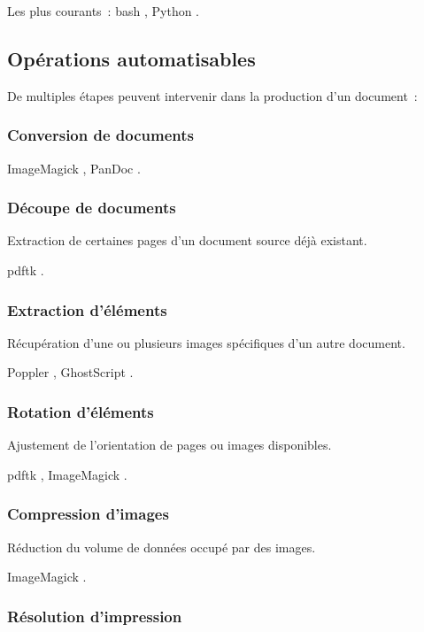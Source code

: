 Les plus courants : \gls{bash} \cite{bash}, Python \cite{py}.

\pagebreak
\subsection{Opérations automatisables}

De multiples étapes peuvent intervenir dans la production d’un document :

\subsubsection{Conversion de documents}

ImageMagick \cite{imagemagick}, PanDoc \cite{pandoc}.

\subsubsection{Découpe de documents}

Extraction de certaines pages d’un document source déjà existant.

\gls{pdftk} \cite{pdftk}.

\subsubsection{Extraction d’éléments}

Récupération d’une ou plusieurs images spécifiques d’un autre document.

Poppler \cite{poppler}, GhostScript \cite{gs}.

\subsubsection{Rotation d’éléments}

Ajustement de l’orientation de pages ou images disponibles.

\gls{pdftk} \cite{pdftk}, ImageMagick \cite{imagemagick}.

\subsubsection{Compression d’images}

Réduction du volume de données occupé par des images.

ImageMagick \cite{imagemagick}.

\subsubsection{Résolution d’impression}


